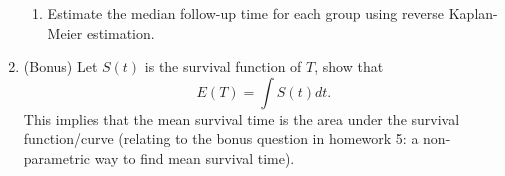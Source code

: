 \begin{enumerate}
\begin{enumerate}
\item Estimate the median follow-up time for each group using reverse Kaplan-Meier estimation.

\end{enumerate}

\item  (Bonus) Let $S(t)$ is the survival function of $T$, show that
$$
E(T) = \int S(t) dt.
$$ 
This implies that the mean survival time is the area under the survival function/curve (relating to the bonus question in homework 5: a non-parametric way to find mean survival time).


\end{enumerate}












